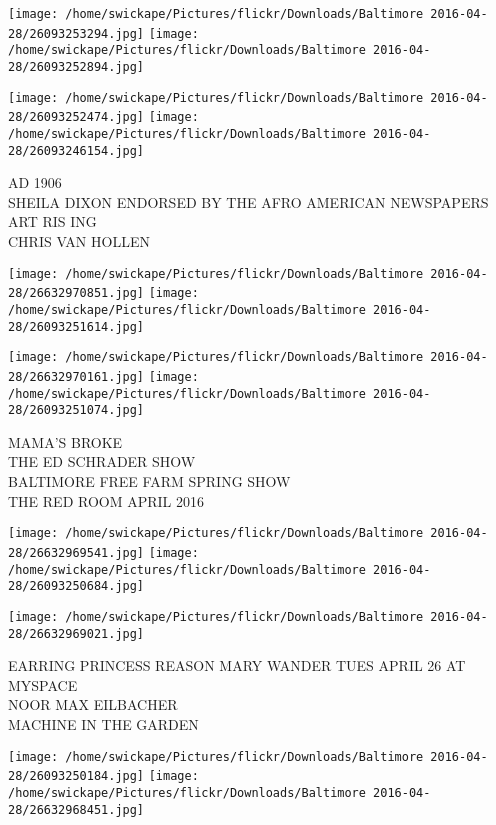 \documentclass[10pt,letterpaper]{article}
\begin{document}
\texttt{[image: /home/swickape/Pictures/flickr/Downloads/Baltimore 2016-04-28/26093253294.jpg]}
\texttt{[image: /home/swickape/Pictures/flickr/Downloads/Baltimore 2016-04-28/26093252894.jpg]}

\texttt{[image: /home/swickape/Pictures/flickr/Downloads/Baltimore 2016-04-28/26093252474.jpg]}
\texttt{[image: /home/swickape/Pictures/flickr/Downloads/Baltimore 2016-04-28/26093246154.jpg]}

AD 1906\\
SHEILA DIXON ENDORSED BY THE AFRO AMERICAN NEWSPAPERS\\
ART RIS ING\\
CHRIS VAN HOLLEN\\
\pagebreak

\texttt{[image: /home/swickape/Pictures/flickr/Downloads/Baltimore 2016-04-28/26632970851.jpg]}
\texttt{[image: /home/swickape/Pictures/flickr/Downloads/Baltimore 2016-04-28/26093251614.jpg]}

\texttt{[image: /home/swickape/Pictures/flickr/Downloads/Baltimore 2016-04-28/26632970161.jpg]}
\texttt{[image: /home/swickape/Pictures/flickr/Downloads/Baltimore 2016-04-28/26093251074.jpg]}

MAMA'S BROKE\\
THE ED SCHRADER SHOW\\
BALTIMORE FREE FARM SPRING SHOW\\
THE RED ROOM APRIL 2016\\
\pagebreak

\texttt{[image: /home/swickape/Pictures/flickr/Downloads/Baltimore 2016-04-28/26632969541.jpg]}
\texttt{[image: /home/swickape/Pictures/flickr/Downloads/Baltimore 2016-04-28/26093250684.jpg]}

\vspace{0.25in}
\texttt{[image: /home/swickape/Pictures/flickr/Downloads/Baltimore 2016-04-28/26632969021.jpg]}

EARRING PRINCESS REASON MARY WANDER TUES APRIL 26 AT MYSPACE\\
NOOR MAX EILBACHER\\
MACHINE IN THE GARDEN\\
\pagebreak

\texttt{[image: /home/swickape/Pictures/flickr/Downloads/Baltimore 2016-04-28/26093250184.jpg]}
\texttt{[image: /home/swickape/Pictures/flickr/Downloads/Baltimore 2016-04-28/26632968451.jpg]}
\end{document}
